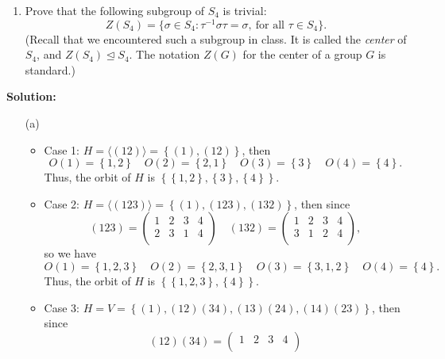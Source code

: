 \documentclass[12pt]{article}
\begin{document}
\begin{enumerate}
\begin{enumerate}[label=(\alph*)]
        \item Prove that the following subgroup of \( S_4 \) is trivial:
        \[
            Z(S_4) = \{ \sigma \in S_4 : \tau^{-1} \sigma \tau = \sigma, \ \text{for all } \tau \in S_4 \}.
        \]
        (Recall that we encountered such a subgroup in class. It is called the \emph{center} of \( S_4 \), and \( Z(S_4) \trianglelefteq S_4 \). The notation \( Z(G) \) for the center of a group \( G \) is standard.)
    \end{enumerate}
    \textbf{Solution:} 
    \begin{itemize}
        \item [(a)] 
        \begin{itemize}
            \item Case 1: \(H = \langle (12) \rangle = \left\{ (1), (12) \right\} \), then
            \[
                O(1) = \left\{ 1, 2 \right\} \quad O(2) = \left\{ 2, 1 \right\} \quad O(3) = \left\{ 3 \right\} \quad O(4) = \left\{ 4 \right\}.    
            \]
            Thus, the orbit of \(H\) is \(\left\{ \left\{ 1, 2 \right\}, \left\{ 3 \right\}, \left\{ 4 \right\} \right\} \).
            \item Case 2: \(H = \langle (123) \rangle = \left\{ (1), (123), (132) \right\} \), then since 
            \[
                (123) = \begin{pmatrix}
                    1 & 2 & 3 & 4  \\
                    2 & 3 & 1 & 4  \\
                \end{pmatrix} \quad 
                (132) = \begin{pmatrix}
                    1 & 2 & 3 & 4  \\
                    3 & 1 & 2 & 4  \\
                \end{pmatrix},
            \]
            so we have 
            \[
                O(1) = \left\{ 1, 2, 3 \right\} \quad O(2) = \left\{ 2, 3, 1 \right\} \quad O(3) = \left\{ 3, 1, 2 \right\} \quad O(4) = \left\{ 4 \right\}.   
            \]
            Thus, the orbit of \(H\) is \(\left\{ \left\{ 1, 2, 3 \right\}, \left\{ 4 \right\}   \right\} \). 
            \item Case 3: \(H = V = \left\{ (1), (12)(34), (13)(24), (14)(23) \right\} \), then since 
            \[
                (12)(34) = \begin{pmatrix}
                    1 & 2 & 3 & 4  \\

\end{pmatrix}\]
\end{itemize}
\end{itemize}
\end{enumerate}
\end{document}
